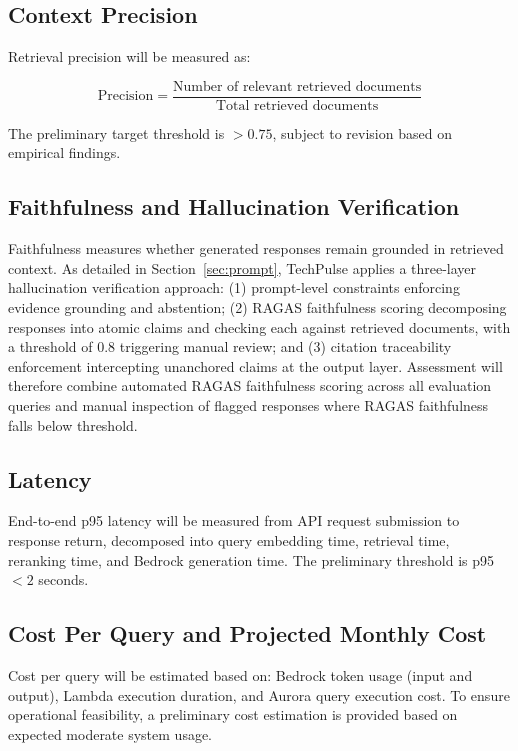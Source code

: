 \documentclass[12pt,a4paper]{report}
\begin{document}
\subsection{Context Precision}

Retrieval precision will be measured as:

\begin{equation}
  \text{Precision} = \frac{\text{Number of relevant retrieved documents}}{\text{Total retrieved documents}}
  \label{eq:precision}
\end{equation}

The preliminary target threshold is $>0.75$, subject to revision based on empirical findings.

\subsection{Faithfulness and Hallucination Verification}

Faithfulness measures whether generated responses remain grounded in retrieved context. As detailed in Section~\ref{sec:prompt}, TechPulse applies a three-layer hallucination verification approach: (1) prompt-level constraints enforcing evidence grounding and abstention; (2) RAGAS faithfulness scoring decomposing responses into atomic claims and checking each against retrieved documents, with a threshold of 0.8 triggering manual review; and (3) citation traceability enforcement intercepting unanchored claims at the output layer. Assessment will therefore combine automated RAGAS faithfulness scoring across all evaluation queries and manual inspection of flagged responses where RAGAS faithfulness falls below threshold.

\subsection{Latency}

End-to-end p95 latency will be measured from API request submission to response return, decomposed into query embedding time, retrieval time, reranking time, and Bedrock generation time. The preliminary threshold is p95 $< 2$ seconds.

\subsection{Cost Per Query and Projected Monthly Cost}

Cost per query will be estimated based on: Bedrock token usage (input and output), Lambda execution duration, and Aurora query execution cost. To ensure operational feasibility, a preliminary cost estimation is provided based on expected moderate system usage.
\end{document}
